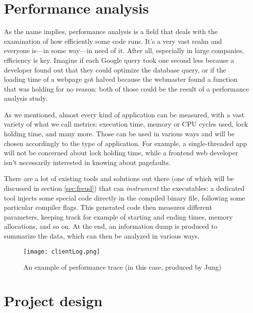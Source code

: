 \chapter{Performance analysis}


As the name implies, performance analysis is a field that deals with
the examination of how efficiently some code runs. It's a very vast
realm and everyone is---in some way---in need of it.  After all,
especially in large companies, efficiency is key. Imagine if each
Google query took one second less because a developer found out that
they could optimize the database query, or if the loading time of a
webpage got halved because the webmaster found a function that was
holding for no reason: both of those could be the result
of a performance analysis study.

    As we mentioned, almost every kind of application can be measured, with a vast variety of what we call metrics:
    execution time, memory or CPU cycles used, lock holding time, and many more. Those can be used in
    various ways and will be chosen accordingly to the type of application. For example, a single-threaded app
    will not be concerned about lock holding time, while a frontend web developer isn't 
    necessarily interested in knowing about pagefaults.

    There are a lot of existing tools and solutions out there (one of which will be discussed in section \ref{sec:freud})
    that can \textit{instrument} the executables: a dedicated tool injects some special code directly in the compiled
    binary file, following some particular compiler flags. This generated code then measures
    different parameters, keeping track for example of starting and ending times, memory allocations, and so on.
    At the end, an information dump is produced to summarize the data, which can then be analyzed in various ways.

    \begin{figure}[H]
        \centering
        \texttt{[image: clientLog.png]}
        \caption{An example of performance trace (in this case, produced by Jung)}
        \label{fig:clientLog}
    \end{figure}


\chapter{Project design}

